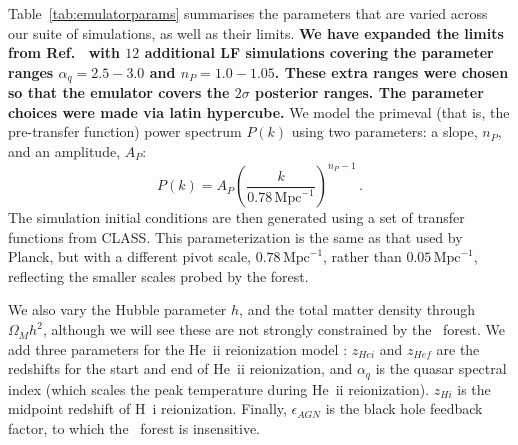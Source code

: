 Table~\ref{tab:emulatorparams} summarises the parameters that are varied across our suite of simulations, as well as their limits. \textbf{We have expanded the limits from Ref.~\cite{2023simsuite} with $12$ additional LF simulations covering the parameter ranges $\alpha_q = 2.5 - 3.0$ and $n_P = 1.0 - 1.05$. These extra ranges were chosen so that the emulator covers the $2\sigma$ posterior ranges. The parameter choices were made via latin hypercube.}
We model the primeval (that is, the pre-transfer function) power spectrum $P(k)$  using two parameters: a slope, $n_P$, and an amplitude, $A_P$:
\begin{equation}
    P(k) = A_P \left(\frac{k}{0.78\, \mathrm{Mpc}^{-1}}\right)^{n_P - 1}\,.
\end{equation}
The simulation initial conditions are then generated using a set of transfer functions from CLASS. This parameterization is the same as that used by Planck, but with a different pivot scale, $0.78\, \mathrm{Mpc}^{-1}$, rather than $0.05 \,\mathrm{Mpc}^{-1}$, reflecting the smaller scales probed by the forest.

We also vary the Hubble parameter $h$, and the total matter density through $\Omega_M h^2$, although we will see these are not strongly constrained by the \Lya~forest.
We add three parameters for the He~{\sc ii} reionization model \cite{2020MNRAS.496.4372U}: $z_{Hei}$ and $z_{Hef}$ are the redshifts for the start and end of He~{\sc ii} reionization, and $\alpha_q$ is the quasar spectral index (which scales the peak temperature during He~{\sc ii} reionization).
$z_{Hi}$ is the midpoint redshift of H~{\sc i} reionization.
Finally, $\epsilon_{AGN}$ is the black hole feedback factor, to which the \lya~forest is insensitive.

